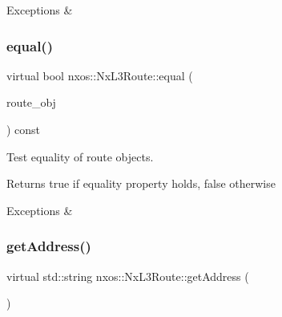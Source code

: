 \begin{DoxyExceptions}{Exceptions}
{\em } & \\
\hline
\end{DoxyExceptions}
\mbox{\label{classnxos_1_1_nx_l3_route_a6dc5e111e8e8ad48aa028fc65cc483b9}} 
\subsubsection{\texorpdfstring{equal()}{equal()}}
{\footnotesize\ttfamily virtual bool nxos\+::\+Nx\+L3\+Route\+::equal (\begin{DoxyParamCaption}\item[{\mbox{\hyperlink{classnxos_1_1_nx_l3_route}{Nx\+L3\+Route}} const \&}]{route\+\_\+obj }\end{DoxyParamCaption}) const\hspace{0.3cm}{\ttfamily [pure virtual]}}

Test equality of route objects.

\begin{DoxyReturn}{Returns}
true if equality property holds, false otherwise
\end{DoxyReturn}

\begin{DoxyCode}
\end{DoxyCode}



\begin{DoxyExceptions}{Exceptions}
{\em } & \\
\hline
\end{DoxyExceptions}
\mbox{\label{classnxos_1_1_nx_l3_route_a3176245539589bf745ce1d196975b3c9}} 
\subsubsection{\texorpdfstring{get\+Address()}{getAddress()}}
{\footnotesize\ttfamily virtual std\+::string nxos\+::\+Nx\+L3\+Route\+::get\+Address (\begin{DoxyParamCaption}{ }\end{DoxyParamCaption})\hspace{0.3cm}{\ttfamily [pure virtual]}}

